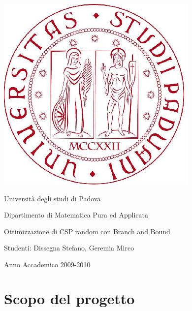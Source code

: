 \documentclass[a4paper,12pt,italian]{article}
\title{\titolo}
\author{\autore}
\newcommand{\titolo}{Ottimizzazione di CSP random con Branch and Bound}
\newcommand{\autore}{Dissegna Stefano, Geremia Mirco}
\begin{document}
\begin{titlepage}
\begin{center}
\includegraphics[scale=0.3]{unipd-logo.png} 

\par
\vspace{0.5in}
{\Huge Universit\`a degli studi di Padova}
\par
\vspace{0.5in}
{\LARGE Dipartimento di Matematica Pura ed Applicata}
\par
\vspace{0.3in}
\par
\vspace{0.5in}
{\huge \titolo}
\par
\end{center}
\vspace{0.5in}
\begin{center}
{\Large Studenti: \autore}
\par
\vspace{0.3in}
\end{center}
\par
\vspace{0.5in}
\begin{center}
Anno Accademico 2009-2010
\end{center}

\end{titlepage}

\tableofcontents
\newpage

\section{Scopo del progetto}
\end{document}

